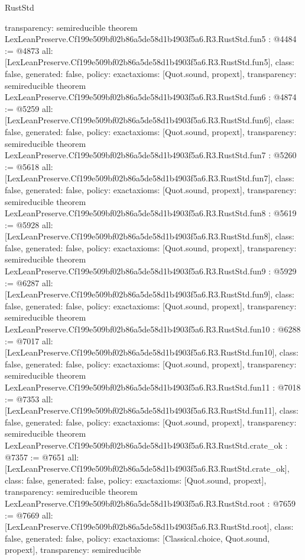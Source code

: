 \begin{lexlean}{RustStd}
\begin{coremodule}
{  transparency: semireducible
}
theorem LexLeanPreserve.Cf199e509bf02b86a5de58d1b4903f5a6.R3.RustStd.fun5 : @4484 := @4873 {
  all: [LexLeanPreserve.Cf199e509bf02b86a5de58d1b4903f5a6.R3.RustStd.fun5],
  class: false,
  generated: false,
  policy: exact{axioms: [Quot.sound, propext]},
  transparency: semireducible
}
theorem LexLeanPreserve.Cf199e509bf02b86a5de58d1b4903f5a6.R3.RustStd.fun6 : @4874 := @5259 {
  all: [LexLeanPreserve.Cf199e509bf02b86a5de58d1b4903f5a6.R3.RustStd.fun6],
  class: false,
  generated: false,
  policy: exact{axioms: [Quot.sound, propext]},
  transparency: semireducible
}
theorem LexLeanPreserve.Cf199e509bf02b86a5de58d1b4903f5a6.R3.RustStd.fun7 : @5260 := @5618 {
  all: [LexLeanPreserve.Cf199e509bf02b86a5de58d1b4903f5a6.R3.RustStd.fun7],
  class: false,
  generated: false,
  policy: exact{axioms: [Quot.sound, propext]},
  transparency: semireducible
}
theorem LexLeanPreserve.Cf199e509bf02b86a5de58d1b4903f5a6.R3.RustStd.fun8 : @5619 := @5928 {
  all: [LexLeanPreserve.Cf199e509bf02b86a5de58d1b4903f5a6.R3.RustStd.fun8],
  class: false,
  generated: false,
  policy: exact{axioms: [Quot.sound, propext]},
  transparency: semireducible
}
theorem LexLeanPreserve.Cf199e509bf02b86a5de58d1b4903f5a6.R3.RustStd.fun9 : @5929 := @6287 {
  all: [LexLeanPreserve.Cf199e509bf02b86a5de58d1b4903f5a6.R3.RustStd.fun9],
  class: false,
  generated: false,
  policy: exact{axioms: [Quot.sound, propext]},
  transparency: semireducible
}
theorem LexLeanPreserve.Cf199e509bf02b86a5de58d1b4903f5a6.R3.RustStd.fun10 : @6288 := @7017 {
  all: [LexLeanPreserve.Cf199e509bf02b86a5de58d1b4903f5a6.R3.RustStd.fun10],
  class: false,
  generated: false,
  policy: exact{axioms: [Quot.sound, propext]},
  transparency: semireducible
}
theorem LexLeanPreserve.Cf199e509bf02b86a5de58d1b4903f5a6.R3.RustStd.fun11 : @7018 := @7353 {
  all: [LexLeanPreserve.Cf199e509bf02b86a5de58d1b4903f5a6.R3.RustStd.fun11],
  class: false,
  generated: false,
  policy: exact{axioms: [Quot.sound, propext]},
  transparency: semireducible
}
theorem LexLeanPreserve.Cf199e509bf02b86a5de58d1b4903f5a6.R3.RustStd.crate_ok : @7357 := @7651 {
  all: [LexLeanPreserve.Cf199e509bf02b86a5de58d1b4903f5a6.R3.RustStd.crate_ok],
  class: false,
  generated: false,
  policy: exact{axioms: [Quot.sound, propext]},
  transparency: semireducible
}
theorem LexLeanPreserve.Cf199e509bf02b86a5de58d1b4903f5a6.R3.RustStd.root : @7659 := @7669 {
  all: [LexLeanPreserve.Cf199e509bf02b86a5de58d1b4903f5a6.R3.RustStd.root],
  class: false,
  generated: false,
  policy: exact{axioms: [Classical.choice, Quot.sound, propext]},
  transparency: semireducible
}


\end{coremodule}
\end{lexlean}
